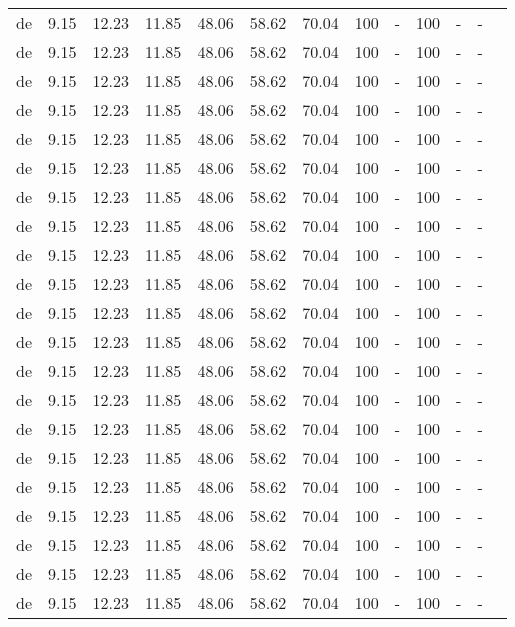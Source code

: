 \begin{table}[H]
\begin{tabularx}{\textwidth}{Xcccccccccccc}
            de & 9.15 & 12.23 & 11.85 & 48.06 & 58.62 & 70.04 & 100 & - & 100 & - & - \\
            de & 9.15 & 12.23 & 11.85 & 48.06 & 58.62 & 70.04 & 100 & - & 100 & - & - \\
            de & 9.15 & 12.23 & 11.85 & 48.06 & 58.62 & 70.04 & 100 & - & 100 & - & - \\
            de & 9.15 & 12.23 & 11.85 & 48.06 & 58.62 & 70.04 & 100 & - & 100 & - & - \\
            de & 9.15 & 12.23 & 11.85 & 48.06 & 58.62 & 70.04 & 100 & - & 100 & - & - \\
            de & 9.15 & 12.23 & 11.85 & 48.06 & 58.62 & 70.04 & 100 & - & 100 & - & - \\
            de & 9.15 & 12.23 & 11.85 & 48.06 & 58.62 & 70.04 & 100 & - & 100 & - & - \\
            de & 9.15 & 12.23 & 11.85 & 48.06 & 58.62 & 70.04 & 100 & - & 100 & - & - \\
            de & 9.15 & 12.23 & 11.85 & 48.06 & 58.62 & 70.04 & 100 & - & 100 & - & - \\
            de & 9.15 & 12.23 & 11.85 & 48.06 & 58.62 & 70.04 & 100 & - & 100 & - & - \\
            de & 9.15 & 12.23 & 11.85 & 48.06 & 58.62 & 70.04 & 100 & - & 100 & - & - \\
            de & 9.15 & 12.23 & 11.85 & 48.06 & 58.62 & 70.04 & 100 & - & 100 & - & - \\
            de & 9.15 & 12.23 & 11.85 & 48.06 & 58.62 & 70.04 & 100 & - & 100 & - & - \\
            de & 9.15 & 12.23 & 11.85 & 48.06 & 58.62 & 70.04 & 100 & - & 100 & - & - \\
            de & 9.15 & 12.23 & 11.85 & 48.06 & 58.62 & 70.04 & 100 & - & 100 & - & - \\
            de & 9.15 & 12.23 & 11.85 & 48.06 & 58.62 & 70.04 & 100 & - & 100 & - & - \\
            de & 9.15 & 12.23 & 11.85 & 48.06 & 58.62 & 70.04 & 100 & - & 100 & - & - \\
            de & 9.15 & 12.23 & 11.85 & 48.06 & 58.62 & 70.04 & 100 & - & 100 & - & - \\
            de & 9.15 & 12.23 & 11.85 & 48.06 & 58.62 & 70.04 & 100 & - & 100 & - & - \\
            de & 9.15 & 12.23 & 11.85 & 48.06 & 58.62 & 70.04 & 100 & - & 100 & - & - \\
            de & 9.15 & 12.23 & 11.85 & 48.06 & 58.62 & 70.04 & 100 & - & 100 & - & - \\

\end{tabularx}
\end{table}

